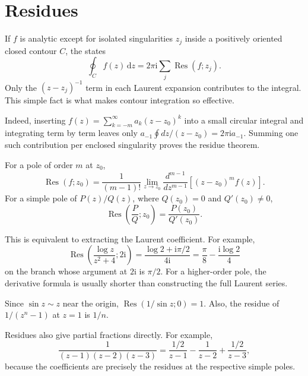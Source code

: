 \section{Residues}

If $f$ is analytic except for isolated singularities $z_j$ inside a positively oriented closed contour $C$, the  states
\begin{equation}
\oint_Cf(z)\,\mathrm{d}z=2\pi\mathrm{i}\sum_j\operatorname{Res}(f;z_j).
\label{eq:ch06-residue-theorem}
\end{equation}
Only the $(z-z_j)^{-1}$ term in each Laurent expansion contributes to the integral. This simple fact is what makes contour integration so effective.

Indeed, inserting $f(z)=\sum_{k=-m}^\infty a_k(z-z_0)^k$ into a small circular integral and integrating term by term leaves only $a_{-1}\oint dz/(z-z_0)=2\pi\mathrm{i}a_{-1}$. Summing one such contribution per enclosed singularity proves the residue theorem.

For a pole of order $m$ at $z_0$,
\begin{equation}
\operatorname{Res}(f;z_0)=\frac{1}{(m-1)!}\lim_{z\to z_0}
\frac{d^{m-1}}{dz^{m-1}}\left[(z-z_0)^mf(z)\right].
\end{equation}
For a simple pole of $P(z)/Q(z)$, where $Q(z_0)=0$ and $Q'(z_0)\ne0$,
\begin{equation}
\operatorname{Res}\left(\frac{P}{Q};z_0\right)=\frac{P(z_0)}{Q'(z_0)}.
\end{equation}

This is equivalent to extracting the Laurent coefficient. For example,
\begin{equation}
\operatorname{Res}\left(\frac{\log z}{z^2+4};2\mathrm{i}\right)
=\frac{\log2+\mathrm{i}\pi/2}{4\mathrm{i}}
=\frac{\pi}{8}-\frac{\mathrm{i}\log2}{4}
\end{equation}
on the branch whose argument at $2\mathrm{i}$ is $\pi/2$. For a higher-order pole, the derivative formula is usually shorter than constructing the full Laurent series.

\begin{example}
Since $\sin z\sim z$ near the origin, $\operatorname{Res}(1/\sin z;0)=1$. Also, the residue of $1/(z^n-1)$ at $z=1$ is $1/n$.
\end{example}

Residues also give partial fractions directly. For example,
\begin{equation}
\frac{1}{(z-1)(z-2)(z-3)}=\frac{1/2}{z-1}-\frac{1}{z-2}+\frac{1/2}{z-3},
\end{equation}
because the coefficients are precisely the residues at the respective simple poles.


